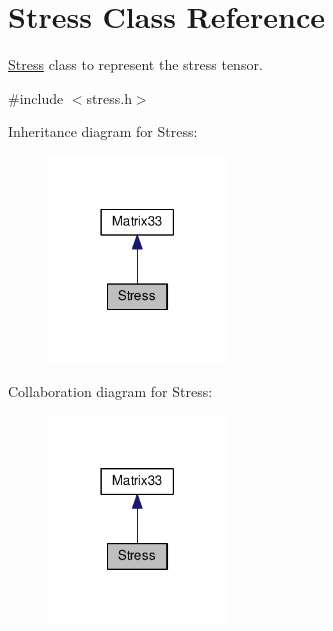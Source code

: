 \hypertarget{classStress}{\section{Stress Class Reference}
\label{d1/d1c/classStress}
}


\hyperlink{classStress}{Stress} class to represent the stress tensor.  




{\ttfamily \#include $<$stress.\-h$>$}



Inheritance diagram for Stress\-:\nopagebreak
\begin{figure}[H]
\begin{center}
\leavevmode
\includegraphics[width=134pt]{dd/d46/classStress__inherit__graph}
\end{center}
\end{figure}


Collaboration diagram for Stress\-:\nopagebreak
\begin{figure}[H]
\begin{center}
\leavevmode
\includegraphics[width=134pt]{d7/dfa/classStress__coll__graph}
\end{center}
\end{figure}
